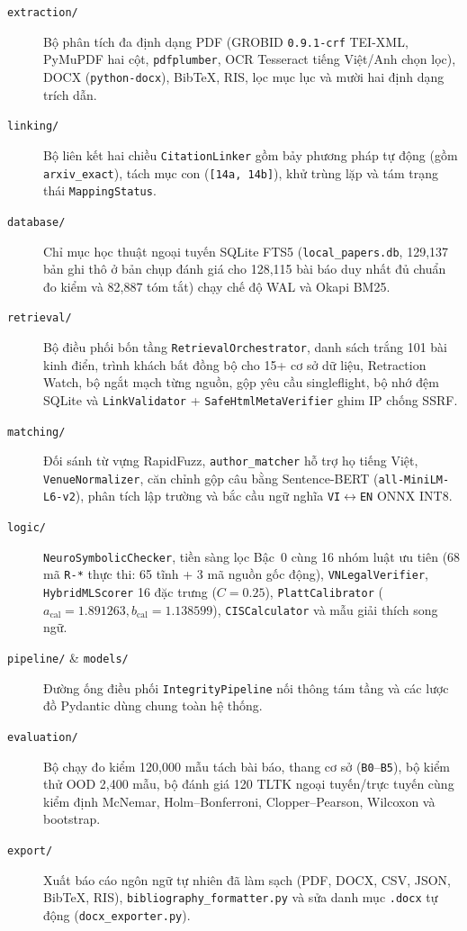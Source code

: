\begin{description}
    \item[\texttt{extraction/}] Bộ phân tích đa định dạng PDF (GROBID \texttt{0.9.1-crf} TEI-XML, PyMuPDF hai cột, \texttt{pdfplumber}, OCR Tesseract tiếng Việt/Anh chọn lọc), DOCX (\texttt{python-docx}), BibTeX, RIS, lọc mục lục và mười hai định dạng trích dẫn.
    \item[\texttt{linking/}] Bộ liên kết hai chiều \texttt{CitationLinker} gồm bảy phương pháp tự động (gồm \texttt{arxiv\_exact}), tách mục con (\texttt{[14a, 14b]}), khử trùng lặp và tám trạng thái \texttt{MappingStatus}.
    \item[\texttt{database/}] Chỉ mục học thuật ngoại tuyến SQLite FTS5 (\texttt{local\_papers.db}, 129,137 bản ghi thô ở bản chụp đánh giá cho 128,115 bài báo duy nhất đủ chuẩn đo kiểm và 82,887 tóm tắt) chạy chế độ WAL và Okapi BM25.
    \item[\texttt{retrieval/}] Bộ điều phối bốn tầng \texttt{RetrievalOrchestrator}, danh sách trắng 101 bài kinh điển, trình khách bất đồng bộ cho 15+ cơ sở dữ liệu, Retraction Watch, bộ ngắt mạch từng nguồn, gộp yêu cầu singleflight, bộ nhớ đệm SQLite và \texttt{LinkValidator} + \texttt{SafeHtmlMetaVerifier} ghim IP chống SSRF.
    \item[\texttt{matching/}] Đối sánh từ vựng RapidFuzz, \texttt{author\_matcher} hỗ trợ họ tiếng Việt, \texttt{VenueNormalizer}, căn chỉnh gộp câu bằng Sentence-BERT (\texttt{all-MiniLM-\allowbreak{}L6-v2}), phân tích lập trường và bắc cầu ngữ nghĩa \texttt{VI}$\leftrightarrow$\texttt{EN} ONNX INT8.
    \item[\texttt{logic/}] \texttt{NeuroSymbolicChecker}, tiền sàng lọc Bậc~0 cùng 16 nhóm luật ưu tiên (68 mã \texttt{R-*} thực thi: 65 tĩnh + 3 mã nguồn gốc động), \texttt{VNLegalVerifier}, \texttt{HybridMLScorer} 16 đặc trưng ($C = 0.25$), \texttt{PlattCalibrator} ($a_{\text{cal}} = 1.891263, b_{\text{cal}} = 1.138599$), \texttt{CISCalculator} và mẫu giải thích song ngữ.
    \item[\texttt{pipeline/} \& \texttt{models/}] Đường ống điều phối \texttt{IntegrityPipeline} nối thông tám tầng và các lược đồ Pydantic dùng chung toàn hệ thống.
    \item[\texttt{evaluation/}] Bộ chạy đo kiểm 120,000 mẫu tách bài báo, thang cơ sở (\texttt{B0}--\texttt{B5}), bộ kiểm thử OOD 2,400 mẫu, bộ đánh giá 120 TLTK ngoại tuyến/trực tuyến cùng kiểm định McNemar, Holm--Bonferroni, Clopper--Pearson, Wilcoxon và bootstrap.
    \item[\texttt{export/}] Xuất báo cáo ngôn ngữ tự nhiên đã làm sạch (PDF, DOCX, CSV, JSON, BibTeX, RIS), \texttt{bibliography\_formatter.py} và sửa danh mục \texttt{.docx} tự động (\texttt{docx\_exporter.py}).

\end{description}
